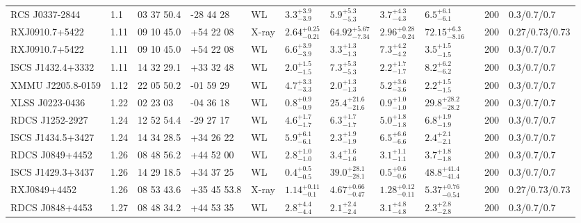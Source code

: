 \begin{landscape}
\begin{center}
{\begin{longtable}{llllllllllll}
RCS J0337-2844 & 1.1 & 03 37 50.4 & -28 44 28 & WL & ${3.3}^{+3.9}_{-3.9}$ & ${5.9}^{+5.3}_{-5.3}$ & ${3.7}^{+4.3}_{-4.3}$ & ${6.5}^{+6.1}_{-6.1}$ & \citet{SE14.1} & 200 & 0.3/0.7/0.7 \\
RXJ0910.7+5422 & 1.11 & 09 10 45.0 & +54 22 08 & X-ray & ${2.64}^{+0.25}_{-0.21}$ & ${64.92}^{+5.67}_{-7.34}$ & ${2.96}^{+0.28}_{-0.24}$ & ${72.15}^{+6.3}_{-8.16}$ & \citet{BA14.1} & 200 & 0.27/0.73/0.73 \\
RXJ0910.7+5422 & 1.11 & 09 10 45.0 & +54 22 08 & WL & ${6.6}^{+3.9}_{-3.9}$ & ${3.3}^{+1.3}_{-1.3}$ & ${7.3}^{+4.2}_{-4.2}$ & ${3.5}^{+1.5}_{-1.5}$ & \citet{SE14.1} & 200 & 0.3/0.7/0.7 \\
ISCS J1432.4+3332 & 1.11 & 14 32 29.1 & +33 32 48 & WL & ${2.0}^{+1.5}_{-1.5}$ & ${7.3}^{+5.3}_{-5.3}$ & ${2.2}^{+1.7}_{-1.7}$ & ${8.2}^{+6.2}_{-6.2}$ & \citet{SE14.1} & 200 & 0.3/0.7/0.7 \\
XMMU J2205.8-0159 & 1.12 & 22 05 50.2 & -01 59 29 & WL & ${4.7}^{+3.3}_{-3.3}$ & ${2.0}^{+1.3}_{-1.3}$ & ${5.2}^{+3.6}_{-3.6}$ & ${2.2}^{+1.5}_{-1.5}$ & \citet{SE14.1} & 200 & 0.3/0.7/0.7 \\
XLSS J0223-0436 & 1.22 & 02 23 03 & -04 36 18 & WL & ${0.8}^{+0.9}_{-0.9}$ & ${25.4}^{+21.6}_{-21.6}$ & ${0.9}^{+1.0}_{-1.0}$ & ${29.8}^{+28.2}_{-28.2}$ & \citet{SE14.1} & 200 & 0.3/0.7/0.7 \\
RDCS J1252-2927 & 1.24 & 12 52 54.4 & -29 27 17 & WL & ${4.6}^{+1.7}_{-1.7}$ & ${6.3}^{+1.7}_{-1.7}$ & ${5.0}^{+1.8}_{-1.8}$ & ${6.8}^{+1.9}_{-1.9}$ & \citet{SE14.1} & 200 & 0.3/0.7/0.7 \\
ISCS J1434.5+3427 & 1.24 & 14 34 28.5 & +34 26 22 & WL & ${5.9}^{+6.1}_{-6.1}$ & ${2.3}^{+1.9}_{-1.9}$ & ${6.5}^{+6.6}_{-6.6}$ & ${2.4}^{+2.1}_{-2.1}$ & \citet{SE14.1} & 200 & 0.3/0.7/0.7 \\
RDCS J0849+4452 & 1.26 & 08 48 56.2 & +44 52 00 & WL & ${2.8}^{+1.0}_{-1.0}$ & ${3.4}^{+1.6}_{-1.6}$ & ${3.1}^{+1.1}_{-1.1}$ & ${3.7}^{+1.8}_{-1.8}$ & \citet{SE14.1} & 200 & 0.3/0.7/0.7 \\
ISCS J1429.3+3437 & 1.26 & 14 29 18.5 & +34 37 25 & WL & ${0.4}^{+0.5}_{-0.5}$ & ${39.0}^{+28.1}_{-28.1}$ & ${0.5}^{+0.6}_{-0.6}$ & ${48.8}^{+41.4}_{-41.4}$ & \citet{SE14.1} & 200 & 0.3/0.7/0.7 \\
RXJ0849+4452 & 1.26 & 08 53 43.6 & +35 45 53.8 & X-ray & ${1.14}^{+0.11}_{-0.1}$ & ${4.67}^{+0.66}_{-0.47}$ & ${1.28}^{+0.12}_{-0.11}$ & ${5.37}^{+0.76}_{-0.54}$ & \citet{BA14.1} & 200 & 0.27/0.73/0.73 \\
RDCS J0848+4453 & 1.27 & 08 48 34.2 & +44 53 35 & WL & ${2.8}^{+4.4}_{-4.4}$ & ${2.1}^{+2.4}_{-2.4}$ & ${3.1}^{+4.8}_{-4.8}$ & ${2.3}^{+2.8}_{-2.8}$ & \citet{SE14.1} & 200 & 0.3/0.7/0.7 \\

\end{longtable}}
\end{center}
\end{landscape}
